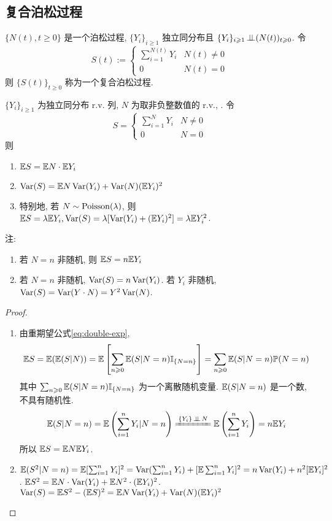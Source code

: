 \subsection{复合泊松过程}

\begin{definition}
    $\{N(t),t\geq 0\}$ 是一个泊松过程, $\{Y_i\}_{i\geq 1}$ 独立同分布且 $\{Y_i\}_{i\geqslant 1}\operatorname{\perp\!\!\!\perp} (N(t))_{t\geqslant 0}$. 令
    \[
    S(t):=\begin{cases}
        \sum_{i=1}^{N(t)}Y_i & N(t)\neq 0\\
        0 & N(t)=0
    \end{cases}
    \]
    则 $\{S(t)\}_{t\geq 0}$ 称为一个复合泊松过程.
\end{definition}

\begin{theorem}
    $\{Y_i\}_{i\geq 1}$ 为独立同分布 r.v. 列, $N$ 为取非负整数值的 r.v., . 令
    \[
    S=\begin{cases}
        \sum_{i=1}^N Y_i & N\neq 0\\
        0 & N=0
    \end{cases}
    \]
    则
    \begin{enumerate}
        \item $\mathbb E S=\mathbb E N\cdot \mathbb E Y_i$
        \item $\operatorname{Var} (S)=\mathbb E N \operatorname{Var}(Y_i)+\operatorname{Var}(N)(\mathbb E Y_i)^2$
        \item 特别地, 若 $N\sim \operatorname{Poisson}(\lambda)$, 则 $\mathbb E S=\lambda\mathbb E Y_i,\operatorname{Var}(S)=\lambda[\operatorname{Var}(Y_i)+(\mathbb E Y_i)^2]=\lambda \mathbb E Y_i^2$.
    \end{enumerate}
\end{theorem}
注:
\begin{enumerate}
    \item 若 $N=n$ 非随机, 则 $\mathbb E S=n\mathbb E Y_i$
    \item 若 $N=n$ 非随机, $\operatorname{Var}(S)=n\operatorname{Var}(Y_i)$. 若 $Y_i$ 非随机, $\operatorname{Var}(S)=\operatorname{Var}(Y\cdot N)=Y^2\operatorname{Var}(N)$.
\end{enumerate}

\begin{proof}
    \begin{enumerate}
        \item 由重期望公式\eqref{eq:double-exp}, 
        \[
        \mathbb E S=\mathbb E(\mathbb E(S|N))=\mathbb E\left[\sum_{n\geqslant 0}\mathbb E(S|N=n)\mathbb I_{\{N=n\}}\right]=\sum_{n\geqslant 0}\mathbb E(S|N=n)\mathbb{P}(N=n)
        \]
        其中 $\sum_{n\geqslant 0}\mathbb E(S|N=n)\mathbb I_{\{N=n\}}$ 为一个离散随机变量. $\mathbb E(S|N=n)$ 是一个数, 不具有随机性.
        \[
        \EE(S|N=n)=\EE\left(\sum_{i=1}^n Y_i|N=n\right)\xlongequal{\{Y_i\}\ind N}\EE\left(\sum_{i=1}^n Y_i\right)=n\EE Y_i
        \]
        所以 $\mathbb E S=\mathbb E N\mathbb E Y_i$.
        \item $\mathbb E(S^2|N=n)=\mathbb E[\sum_{i=1}^n Y_i]^2=\operatorname{Var}(\sum_{i=1}^n Y_i)+[\mathbb E \sum_{i=1}^n Y_i]^2=n\operatorname{Var}(Y_i)+n^2[\mathbb E Y_i]^2$. $\mathbb E S^2=\mathbb E N\cdot \operatorname{Var}(Y_i)+\mathbb E N^2\cdot (\mathbb E Y_i)^2$. $\operatorname{Var}(S)=\mathbb E S^2-(\mathbb E S)^2=\mathbb E N\operatorname{Var}(Y_i)+\operatorname{Var}(N)(\mathbb E Y_i)^2$
    \end{enumerate}
\end{proof}
\newpage